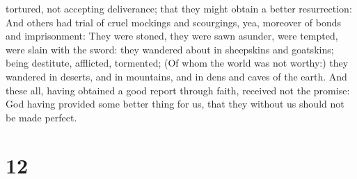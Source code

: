tortured, not accepting deliverance; that they might obtain a better
resurrection:  And others had trial of cruel mockings and
scourgings, yea, moreover of bonds and imprisonment: 
They were stoned, they were sawn asunder, were tempted, were slain with
the sword: they wandered about in sheepskins and goatskins; being
destitute, afflicted, tormented;  (Of whom the world was
not worthy:) they wandered in deserts, and in mountains, and in dens and
caves of the earth.  And these all, having obtained a
good report through faith, received not the promise:  God
having provided some better thing for us, that they without us should
not be made perfect.

\hypertarget{section-11}{%
\section{12}\label{section-11}}

